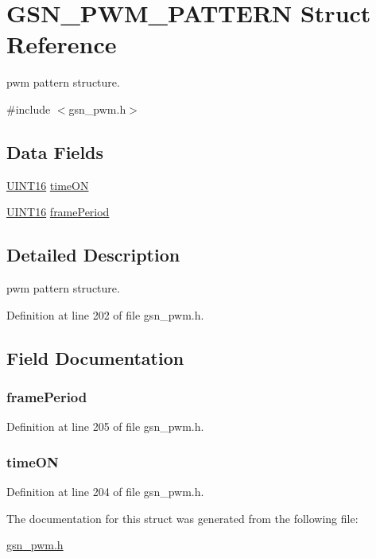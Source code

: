 \hypertarget{a00183}{
\section{GSN\_\-PWM\_\-PATTERN Struct Reference}
\label{a00183}
}


pwm pattern structure.  




{\ttfamily \#include $<$gsn\_\-pwm.h$>$}

\subsection*{Data Fields}
\begin{DoxyCompactItemize}
\item 
\hyperlink{a00660_ga09f1a1fb2293e33483cc8d44aefb1eb1}{UINT16} \hyperlink{a00183_ab455643410d51c3ef6777d364379bcf3}{timeON}
\item 
\hyperlink{a00660_ga09f1a1fb2293e33483cc8d44aefb1eb1}{UINT16} \hyperlink{a00183_a681fd86877b558cfa03fbacb881e788f}{framePeriod}
\end{DoxyCompactItemize}


\subsection{Detailed Description}
pwm pattern structure. 

Definition at line 202 of file gsn\_\-pwm.h.



\subsection{Field Documentation}
\hypertarget{a00183_a681fd86877b558cfa03fbacb881e788f}{
\subsubsection[{framePeriod}]{ {\bf framePeriod}}}
\label{a00183_a681fd86877b558cfa03fbacb881e788f}


Definition at line 205 of file gsn\_\-pwm.h.

\hypertarget{a00183_ab455643410d51c3ef6777d364379bcf3}{
\subsubsection[{timeON}]{ {\bf timeON}}}
\label{a00183_ab455643410d51c3ef6777d364379bcf3}


Definition at line 204 of file gsn\_\-pwm.h.



The documentation for this struct was generated from the following file:\begin{DoxyCompactItemize}
\item 
\hyperlink{a00540}{gsn\_\-pwm.h}\end{DoxyCompactItemize}
